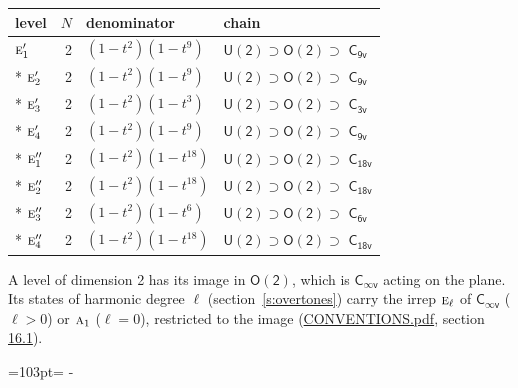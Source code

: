 \documentclass[10pt,a4paper]{article}
\newcommand{\needspace}[1]{\par\penalty-100\begingroup\dimen0=#1\relax\dimen2=\pagegoal
  \advance\dimen2-\pagetotal\ifdim\dimen0>\dimen2\relax\ifdim\dimen2>0pt\vfil\break\fi\fi
  \endgroup}
\numberwithin{equation}{section}
\newcommand{\grp}[1]{\mathsf{#1}}
\newcommand{\irr}[1]{\text{\normalfont\scshape #1}}
\begin{document}
{\small\begin{longtable}{@{}lrll@{}}\toprule
level & $N$ & denominator & chain\\\midrule\endhead
\bottomrule\endfoot\endlastfoot
$\irr{e}_{1}'$ & 2 & $(1-t^{2})(1-t^{9})$ & $\grp{U(2)} \supset \grp{O(2)} \supset$ \href{C9v.pdf}{$\grp{C_{9v}}$}\\*
$\irr{e}_{2}'$ & 2 & $(1-t^{2})(1-t^{9})$ & $\grp{U(2)} \supset \grp{O(2)} \supset$ \href{C9v.pdf}{$\grp{C_{9v}}$}\\*
$\irr{e}_{3}'$ & 2 & $(1-t^{2})(1-t^{3})$ & $\grp{U(2)} \supset \grp{O(2)} \supset$ \href{C3v.pdf}{$\grp{C_{3v}}$}\\*
$\irr{e}_{4}'$ & 2 & $(1-t^{2})(1-t^{9})$ & $\grp{U(2)} \supset \grp{O(2)} \supset$ \href{C9v.pdf}{$\grp{C_{9v}}$}\\*
$\irr{e}_{1}''$ & 2 & $(1-t^{2})(1-t^{18})$ & $\grp{U(2)} \supset \grp{O(2)} \supset$ $\grp{C_{18v}}$\\*
$\irr{e}_{2}''$ & 2 & $(1-t^{2})(1-t^{18})$ & $\grp{U(2)} \supset \grp{O(2)} \supset$ $\grp{C_{18v}}$\\*
$\irr{e}_{3}''$ & 2 & $(1-t^{2})(1-t^{6})$ & $\grp{U(2)} \supset \grp{O(2)} \supset$ \href{C6v.pdf}{$\grp{C_{6v}}$}\\*
$\irr{e}_{4}''$ & 2 & $(1-t^{2})(1-t^{18})$ & $\grp{U(2)} \supset \grp{O(2)} \supset$ $\grp{C_{18v}}$\\
\bottomrule\end{longtable}}
A level of dimension 2 has its image in $\grp{O(2)}$, which is \href{Cinfv.pdf}{$\grp{C_{\infty v}}$} acting on the plane. \label{n:index.harmonic.degree}Its states of harmonic degree $\ell$ (section~\ref{s:overtones}) carry the irrep $\irr{e}_{\ell}$ of \href{Cinfv.pdf}{$\grp{C_{\infty v}}$} ($\ell > 0$) or $\irr{a}_{1}$ ($\ell = 0$), restricted to the image (\href{../../CONVENTIONS.pdf}{CONVENTIONS.pdf}, section \href{../../CONVENTIONS.pdf\#conv.16.1}{16.1}).
\needspace{103pt}
\end{document}
